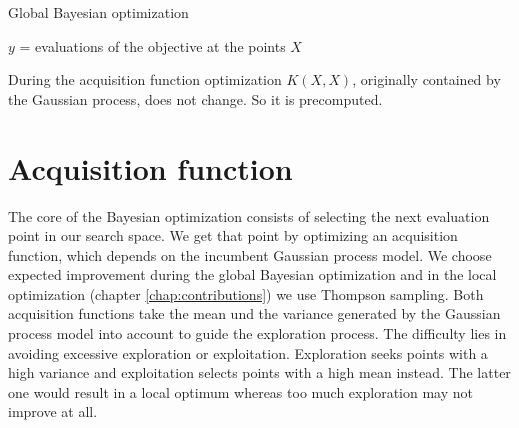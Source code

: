 \begin{algorithm}
    \caption{Global Bayesian optimization\label{alg:boGlob}}
    \BlankLine

    $y$ = evaluations of the objective at the points $X$\\
\end{algorithm}

During the acquisition function optimization $K(X,X)$, originally contained by the Gaussian process, does not change. So it is precomputed.

\section{Acquisition function}
The core of the Bayesian optimization consists of selecting the next evaluation point in our search space. We get that point by optimizing an acquisition function, which depends on the incumbent Gaussian process model. We choose expected improvement during the global Bayesian optimization and in the local optimization (chapter \ref{chap:contributions}) we use Thompson sampling. Both acquisition functions take the mean und the variance generated by the Gaussian process model into account to guide the exploration process. The difficulty lies in avoiding excessive exploration or exploitation. Exploration seeks points with a high variance and exploitation selects points with a high mean instead. The latter one would result in a local optimum whereas too much exploration may not improve at all.

